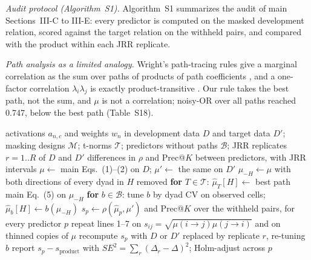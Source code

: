 \documentclass[journal]{IEEEtran}
\begin{document}
\emph{Audit protocol (Algorithm~S1).} Algorithm~S1 summarizes the audit of main Sections~III-C to III-E: every predictor is computed on the masked development relation, scored against the target relation on the withheld pairs, and compared with the product within each JRR replicate.

\emph{Path analysis as a limited analogy.} Wright's path-tracing rules give a marginal correlation as the sum over paths of products of path coefficients \cite{wright1934}, and a one-factor correlation $\lambda_i\lambda_j$ is exactly product-transitive \cite{bollen1989}. Our rule takes the best path, not the sum, and $\mu$ is not a correlation; noisy-OR over all paths reached 0.747, below the best path (Table~S18).

\begin{algorithm}[!t]
\caption{Composition-versus-completion audit of a graded graph (main Section~III)}
\footnotesize
\begin{algorithmic}[1]
\Require activations $a_{n,c}$ and weights $w_n$ in development data $D$ and target data $D'$; masking designs $\mathcal M$; t-norms $\mathcal T$; predictors without paths $\mathcal B$; JRR replicates $r=1..R$ of $D$ and $D'$
\Ensure differences in $\rho$ and Prec@$K$ between predictors, with JRR intervals
\State $\mu\gets$ main Eqs.~(1)--(2) on $D$; $\mu'\gets$ the same on $D'$ 
\State $\mu_{-H}\gets\mu$ with both directions of every dyad in $H$ removed
\State \textbf{for} $T\in\mathcal T$: $\hat\mu_T[H]\gets$ best path main Eq.~(5) on $\mu_{-H}$
\State \textbf{for} $b\in\mathcal B$: tune $b$ by dyad CV on observed cells; $\hat\mu_b[H]\gets b(\mu_{-H})$
\EndFor
\State $s_p\gets\rho(\hat\mu_p,\mu')$ and Prec@$K$ over the withheld pairs, for every predictor $p$
\EndFor
\State repeat lines 1--7 on $s_{ij}=\sqrt{\mu(i\to j)\mu(j\to i)}$ and on thinned copies of $\mu$
\State recompute $s_p$ with $D$ or $D'$ replaced by replicate $r$, re-tuning $b$
\EndFor
\State report $s_p-s_{\text{product}}$ with $SE^2=\sum_r(\Delta_r-\Delta)^2$; Holm-adjust across $p$
\end{algorithmic}
\end{algorithm}
\end{document}
